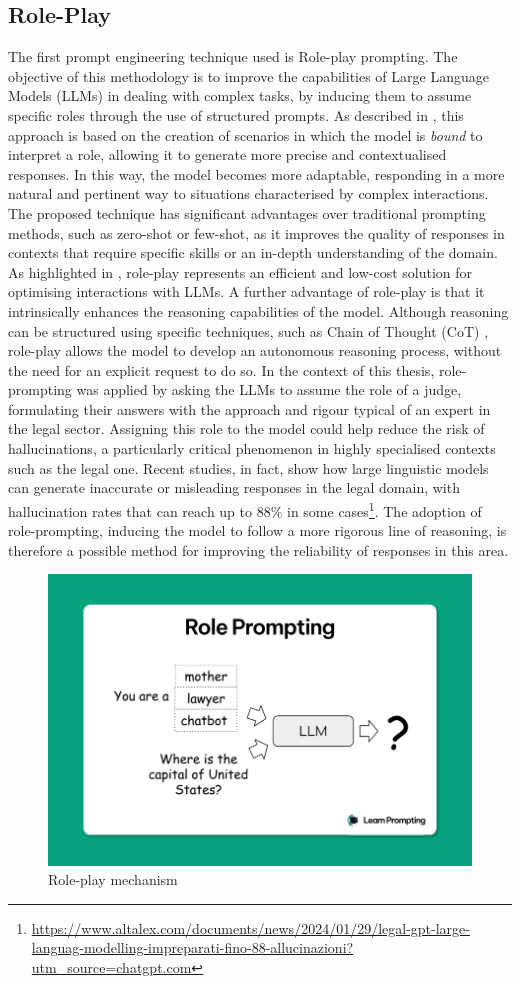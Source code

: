 \subsection{Role-Play}
The first prompt engineering technique used is Role-play prompting. The objective of this methodology is to improve the capabilities of Large Language Models (LLMs) in dealing with complex tasks, by inducing them to assume specific roles through the use of structured prompts.
As described in \cite{Role}, this approach is based on the creation of scenarios in which the model is \textit{bound} to interpret a role, allowing it to generate more precise and contextualised responses. In this way, the model becomes more adaptable, responding in a more natural and pertinent way to situations characterised by complex interactions. The proposed technique has significant advantages over traditional prompting methods, such as zero-shot or few-shot, as it improves the quality of responses in contexts that require specific skills or an in-depth understanding of the domain.
As highlighted in \cite{njifenjou2024roleplayzeroshotpromptinglarge}, role-play represents an efficient and low-cost solution for optimising interactions with LLMs.
A further advantage of role-play is that it intrinsically enhances the reasoning capabilities of the model. Although reasoning can be structured using specific techniques, such as Chain of Thought (CoT) \cite{Cot}, role-play allows the model to develop an autonomous reasoning process, without the need for an explicit request to do so. In the context of this thesis, role-prompting was applied by asking the LLMs to assume the role of a judge, formulating their answers with the approach and rigour typical of an expert in the legal sector.
Assigning this role to the model could help reduce the risk of hallucinations, a particularly critical phenomenon in highly specialised contexts such as the legal one.
Recent studies, in fact, show how large linguistic models can generate inaccurate or misleading responses in the legal domain, with hallucination rates that can reach up to 88\% in some cases\footnote{\url{https://www.altalex.com/documents/news/2024/01/29/legal-gpt-large-languag-modelling-impreparati-fino-88-allucinazioni?utm_source=chatgpt.com}}.
The adoption of role-prompting, inducing the model to follow a more rigorous line of reasoning, is therefore a possible method for improving the reliability of responses in this area.
\begin{figure}[H]
    \centering
    \includegraphics[width=0.7\linewidth]{Figures/Role.png}
    \caption{Role-play mechanism \cite{learnprompting_role}}
    \label{fig:Role}
\end{figure}
